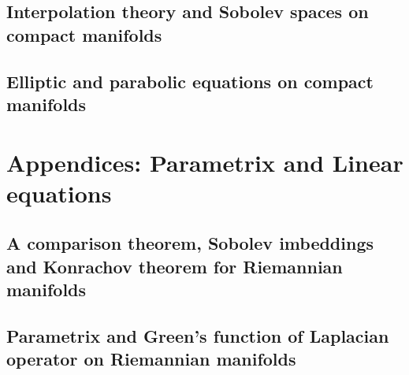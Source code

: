 \documentclass[11pt]{book}
\begin{document}
\chapter{Interpolation theory and Sobolev spaces on compact manifolds }


\chapter{Elliptic and parabolic equations on compact manifolds}


\part{Appendices: Parametrix and Linear equations}
\chapter[Sobolev spaces on Riemannian manifolds]{A comparison theorem, Sobolev imbeddings and Konrachov theorem for Riemannian manifolds}


\chapter[Parametrix and Green's function]{Parametrix and Green's function of Laplacian operator on Riemannian manifolds }




\end{document}
